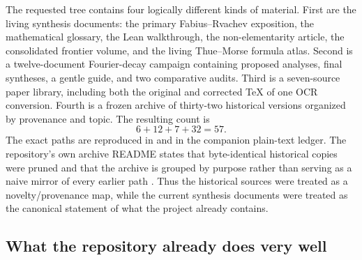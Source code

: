 \documentclass[11pt,oneside]{article}
\theoremstyle{definition}
\theoremstyle{remark}
\begin{document}
The requested tree contains four logically different kinds of material.
First are the living synthesis documents: the primary Fabius--Rvachev exposition, the
mathematical glossary, the Lean walkthrough, the non-elementarity article, the consolidated
frontier volume, and the living Thue--Morse formula atlas.  Second is a twelve-document
Fourier-decay campaign containing proposed analyses, final syntheses, a gentle guide, and two
comparative audits.  Third is a seven-source paper library, including both the original and
corrected TeX of one OCR conversion.  Fourth is a frozen archive of thirty-two historical
versions organized by provenance and topic.  The resulting count is
\[
 6+12+7+32=57.
\]
The exact paths are reproduced in  and in the companion plain-text
ledger.  The repository's own archive README states that byte-identical historical copies
were pruned and that the archive is grouped by purpose rather than serving as a naive mirror
of every earlier path \cite{proveitArchive}.  Thus the historical sources were treated as a
novelty/provenance map, while the current synthesis documents were treated as the canonical
statement of what the project already contains.

\subsection{What the repository already does very well}
\end{document}
